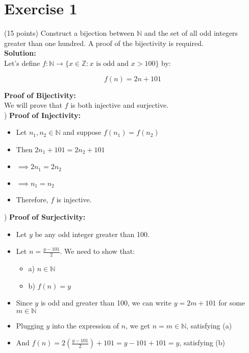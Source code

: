 \documentclass{article}
\begin{document}
\section*{Exercise 1}
(15 points) Construct a bijection between $\mathbb{N}$ and the set of all odd integers greater than one hundred. A proof of the bijectivity is required. \\

\textbf{Solution:} \\

Let's define $f: \mathbb{N} \rightarrow \{x \in \mathbb{Z} : x \text{ is odd and } x > 100\}$ by:

$$f(n) = 2n + 101$$

\textbf{Proof of Bijectivity:}\\

We will prove that $f$ is both injective and surjective. \\

) \textbf{Proof of Injectivity:}
   \begin{itemize}
    \item Let $n_1, n_2 \in \mathbb{N}$ and suppose $f(n_1) = f(n_2)$
    \item Then $2n_1 + 101 = 2n_2 + 101$
    \item $\implies 2n_1 = 2n_2$
    \item $\implies n_1 = n_2$
    \item Therefore, $f$ is injective.
   \end{itemize}

) \textbf{Proof of Surjectivity:}
   \begin{itemize}
    \item Let $y$ be any odd integer greater than 100.
    \item Let $n = \frac{y - 101}{2}$. We need to show that:
    \begin{itemize}
    \item a) $n \in \mathbb{N}$
    \item b) $f(n) = y$
    \end{itemize}

   \item Since $y$ is odd and greater than 100, we can write $y = 2m + 101$ for some $m \in \mathbb{N}$
   \item Plugging $y$ into the expression of $n$, we get $n = m \in \mathbb{N}$, satisfying (a)
   
   \item And $f(n) = 2(\frac{y - 101}{2}) + 101 = y - 101 + 101 = y$, satisfying (b)

   \end{itemize}
\end{document}

